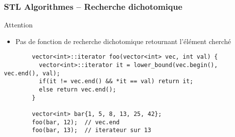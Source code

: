 \documentclass[C++.tex]{subfiles}
\begin{document}
\begin{frame}[fragile]
	\frametitle{STL Algorithmes -- Recherche dichotomique}
	\begin{alertblock}{Attention}
		\begin{itemize}
			\item Pas de fonction de recherche dichotomique retournant l'élément cherché
		\end{itemize}
	\end{alertblock}

	\begin{verbatim}
		vector<int>::iterator foo(vector<int> vec, int val) {
		  vector<int>::iterator it = lower_bound(vec.begin(), vec.end(), val);
		  if(it != vec.end() && *it == val) return it;
		  else return vec.end();
		}

		vector<int> bar{1, 5, 8, 13, 25, 42};
		foo(bar, 12);  // vec.end
		foo(bar, 13);  // iterateur sur 13
	\end{verbatim}

\end{frame}
\end{document}
